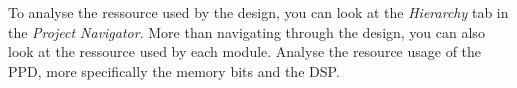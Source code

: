 To analyse the ressource used by the design, you can look at the \textit{Hierarchy} tab in the \textit{Project Navigator}. More than navigating through the design, you can also look at the ressource used by each module. Analyse the resource usage of the PPD, more specifically the memory bits and the DSP.

